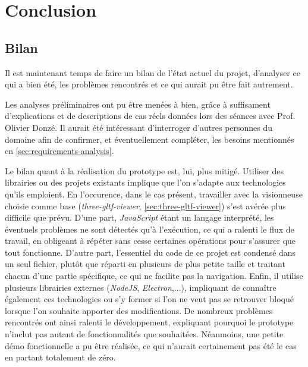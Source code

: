 \chapter{Conclusion}
\label{Chapter4}

\section{Bilan}

Il est maintenant temps de faire un bilan de l'état actuel du projet, d'analyser ce qui a bien été, les problèmes rencontrés et ce qui aurait pu être fait autrement.

Les analyses préliminaires ont pu être menées à bien, grâce à suffisament d'explications et de descriptions de cas réels données lors des séances avec Prof. Olivier Donzé. Il aurait été intéressant d'interroger d'autres personnes du domaine afin de confirmer, et éventuellement compléter, les besoins mentionnés en \ref{sec:requirements-analysis}.

Le bilan quant à la réalisation du prototype est, lui, plus mitigé. Utiliser des librairies ou des projets existants implique que l'on s'adapte aux technologies qu'ils emploient. 
En l'occurence, dans le cas présent, travailler avec la visionneuse choisie comme base (\textit{three-gltf-viewer}, \ref{sec:three-gltf-viewer}) s'est avérée plus difficile que prévu. 
D'une part, \textit{JavaScript} étant un langage interprété, les éventuels problèmes ne sont détectés qu'à l'exécution, ce qui a ralenti le flux de travail, en obligeant à répéter sans cesse certaines opérations pour s'assurer que tout fonctionne. 
D'autre part, l'essentiel du code de ce projet est condensé dans un seul fichier, plutôt que réparti en plusieurs de plus petite taille et traitant chacun d'une partie spécifique, ce qui ne facilite pas la navigation. 
Enfin, il utilise plusieurs librairies externes (\textit{NodeJS}, \textit{Electron},...), impliquant de connaître également ces technologies ou s'y former si l'on ne veut pas se retrouver bloqué lorsque l'on souhaite apporter des modifications.
De nombreux problèmes rencontrés ont ainsi ralenti le développement, expliquant pourquoi le prototype n'inclut pas autant de fonctionnalités que souhaitées.
Néanmoins, une petite démo fonctionnelle a pu être réalisée, ce qui n'aurait certainement pas été le cas en partant totalement de zéro.

